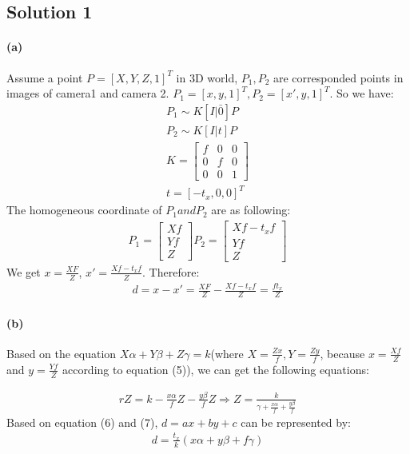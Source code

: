 \documentclass{article}
\newcommand{\solution}[1]{\clearpage \subsection*{Solution #1}}  %
\newcommand{\spart}[1]{\paragraph{(#1)}}
\begin{document}

\solution{1}

\spart{a} 
Assume a point $P = [X,Y,Z,1]^T$ in 3D world, $P_1,P_2$ are corresponded points in images of camera1 and camera 2. $P_1 = [x,y,1]^T, P_2 = [x',y,1]^T$. So we have: 
\begin{align}
	P_1 \sim K[I|\bar{0}]P\\
	P_2 \sim K[I|t]P\\
	K = \left[
		\begin{array}{ccc}
		f & 0 & 0\\
		0 & f & 0\\
		0 & 0 & 1
		\end{array}
		\right]\\
	t = [-t_x,0,0]^T
\end{align}
The homogeneous coordinate of $P_1 and P_2$ are as following:
\begin{align}
	P_1 = \left[
			\begin{array}{c}
			Xf\\
			Yf\\
			Z
			\end{array}
		\right]
	P_2 = \left[
			\begin{array}{c}
			Xf - t_xf\\
			Yf\\
			Z
			\end{array}
		\right]
	\end{align}
We get $x = \frac{XF}{Z}$, $x' = \frac{Xf-t_xf}{Z}$. Therefore:
\begin{align}
	d = x - x' = \frac{XF}{Z} -  \frac{Xf-t_xf}{Z} = \frac{ft_x}{Z} 
\end{align}
\spart{b} 
Based on the equation $X\alpha+Y\beta+Z\gamma = k$(where $X=\frac{Zx}{f}, Y=\frac{Zy}{f}$, because $x=\frac{Xf}{Z}$ and $y=\frac{Yf}{Z}$ according to equation (5)), we can get the following equations:
 
\begin{align}
	rZ = k - \frac{x\alpha}{f}Z - \frac{y\beta}{f}Z \Rightarrow Z = \frac{k}{\gamma+\frac{x\alpha}{f} + \frac{y\beta}{f}}
\end{align}
Based on equation (6) and (7), $d = ax + by + c$ can be represented by:
\begin{align}
	d = \frac{t_x}{k}(x\alpha + y\beta + f\gamma)
\end{align}
\end{document}
